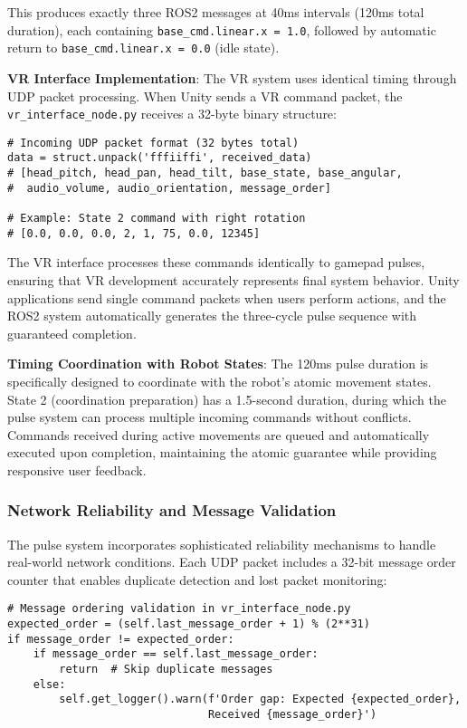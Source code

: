 This produces exactly three ROS2 messages at 40ms intervals (120ms total duration), each containing \texttt{base\_cmd.linear.x = 1.0}, followed by automatic return to \texttt{base\_cmd.linear.x = 0.0} (idle state).

\textbf{VR Interface Implementation}: The VR system uses identical timing through UDP packet processing. When Unity sends a VR command packet, the \texttt{vr\_interface\_node.py} receives a 32-byte binary structure:

\begin{verbatim}
# Incoming UDP packet format (32 bytes total)
data = struct.unpack('fffiiffi', received_data)
# [head_pitch, head_pan, head_tilt, base_state, base_angular, 
#  audio_volume, audio_orientation, message_order]

# Example: State 2 command with right rotation
# [0.0, 0.0, 0.0, 2, 1, 75, 0.0, 12345]
\end{verbatim}

The VR interface processes these commands identically to gamepad pulses, ensuring that VR development accurately represents final system behavior. Unity applications send single command packets when users perform actions, and the ROS2 system automatically generates the three-cycle pulse sequence with guaranteed completion.

\textbf{Timing Coordination with Robot States}: The 120ms pulse duration is specifically designed to coordinate with the robot's atomic movement states. State 2 (coordination preparation) has a 1.5-second duration, during which the pulse system can process multiple incoming commands without conflicts. Commands received during active movements are queued and automatically executed upon completion, maintaining the atomic guarantee while providing responsive user feedback.

\subsubsection{Network Reliability and Message Validation}

The pulse system incorporates sophisticated reliability mechanisms to handle real-world network conditions. Each UDP packet includes a 32-bit message order counter that enables duplicate detection and lost packet monitoring:

\begin{verbatim}
# Message ordering validation in vr_interface_node.py
expected_order = (self.last_message_order + 1) % (2**31)
if message_order != expected_order:
    if message_order == self.last_message_order:
        return  # Skip duplicate messages
    else:
        self.get_logger().warn(f'Order gap: Expected {expected_order}, 
                               Received {message_order}')
\end{verbatim}

